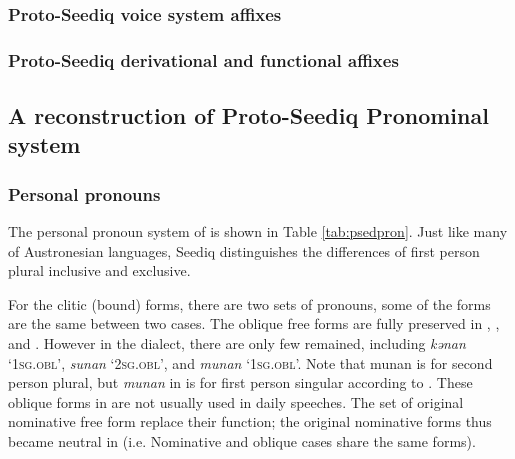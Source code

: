 \subsubsection{Proto-Seediq voice system affixes}
\lipsum[1]

\subsubsection{Proto-Seediq derivational and functional affixes}
\lipsum[1]

\subsection{A reconstruction of Proto-Seediq Pronominal system}
\lipsum[1]

\subsubsection{Personal pronouns}

The personal pronoun system of \psedf is shown in Table \ref{tab:psedpron}. Just like many of Austronesian languages, Seediq distinguishes the differences of first person plural inclusive and exclusive. 

For the clitic (bound) forms, there are two sets of pronouns, some of the forms are the same between two cases. The oblique free forms are fully preserved in \stof, \sctrf, and \setrf. However in the \stgf dialect, there are only few remained, including \textit{kənan} `\textsc{1sg.obl}', \textit{sunan} `\textsc{2sg.obl}', and \textit{munan} `\textsc{1sg.obl}'. Note that \psedf *munan is for second person plural, but \textit{munan} in \stgf is for first person singular according to \textcite[62]{Sung2018Sedgrammar}. These oblique forms in \stgf are not usually used in daily speeches. The set of original nominative free form replace their function; the original nominative forms thus became neutral in \stgf (i.e. Nominative and oblique cases share the same forms).

